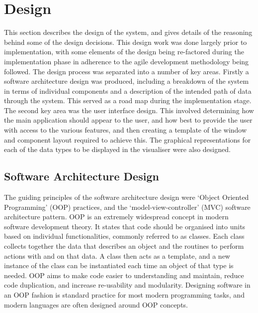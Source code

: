 
\chapter[Design]{Design} %

\label{Chapter8} %


This section describes the design of the system, and gives details of the reasoning behind some of the design decisions. This design work was done largely prior to implementation, with some elements of the design being re-factored during the implementation phase in adherence to the agile development methodology being followed. The design process was separated into a number of key areas. Firstly a software architecture design was produced, including a breakdown of the system in terms of individual components and a description of the intended path of data through the system. This served as a road map during the implementation stage. The second key area was the user interface design. This involved determining how the main application should appear to the user, and how best to provide the user with access to the various features, and then creating a template of the window and component layout required to achieve this. The graphical representations for each of the data types to be displayed in the visualiser were also designed.


\section{Software Architecture Design} \label{SoftwareArchitectureDesign}
The guiding principles of the software architecture design were `Object Oriented Programming' (OOP) practices, and the `model-view-controller' (MVC) software architecture pattern. OOP \cite{OOP} is an extremely widespread concept in modern software development theory. It states that code should be organised into units based on individual functionalities, commonly referred to as classes. Each class collects together the data that describes an object and the routines to perform actions with and on that data. A class then acts as a template, and a new instance of the class can be instantiated each time an object of that type is needed. OOP aims to make code easier to understanding and maintain, reduce code duplication, and increase re-usability and modularity. Designing software in an OOP fashion is standard practice for most modern programming tasks, and modern languages are often designed around OOP concepts.

